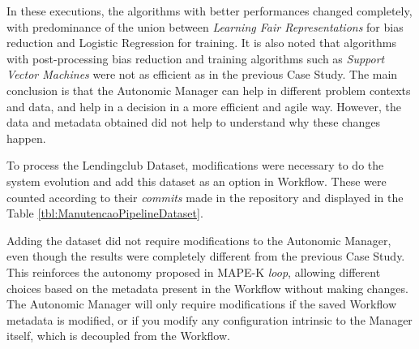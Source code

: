 \documentclass[sigconf]{acmart}
\begin{document}
In these executions, the algorithms with better performances changed completely, with predominance of the union between \textit{Learning Fair Representations} for bias reduction and Logistic Regression for training. It is also noted that algorithms with post-processing bias reduction and training algorithms such as \textit{Support Vector Machines} were not as efficient as in the previous Case Study. The main conclusion is that the Autonomic Manager can help in different problem contexts and data, and help in a decision in a more efficient and agile way. However, the data and metadata obtained did not help to understand why these changes happen.

To process the Lendingclub Dataset, modifications were necessary to do the system evolution and add this dataset as an option in Workflow. These were counted according to their \textit{commits} made in the repository and displayed in the Table \ref{tbl:ManutencaoPipelineDataset}.

\begin{table}[H]
\begin{center}
  \caption{Number of modifications performed when adding a new dataset to Workflow}
\label{tbl:ManutencaoPipelineDataset}
\end{center}
\end{table}

Adding the dataset did not require modifications to the Autonomic Manager, even though the results were completely different from the previous Case Study. This reinforces the autonomy proposed in MAPE-K \textit{loop}, allowing different choices based on the metadata present in the Workflow without making changes. The Autonomic Manager will only require modifications if the saved Workflow metadata is modified, or if you modify any configuration intrinsic to the Manager itself, which is decoupled from the Workflow.
\end{document}
